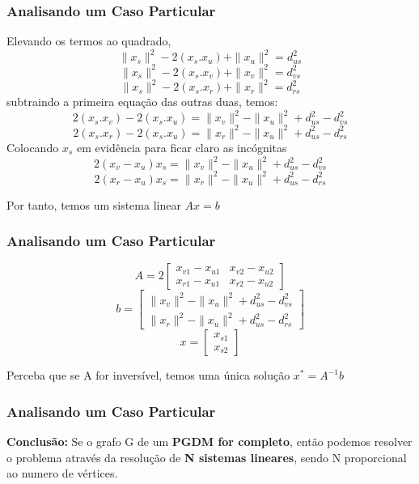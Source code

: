 \documentclass{beamer}
\begin{document}
\begin{frame}
\frametitle{\normalsize Analisando um Caso Particular}
Elevando os termos ao quadrado,
\vspace{-0.2cm}
$$\|x_{s}\|^{2} - 2(x_{s}.x_{u}) + \|x_{u}\|^{2} = d_{us}^{2}$$
\vspace{-0.7cm}$$\|x_{s}\|^{2} - 2(x_{s}.x_{v}) + \|x_{v}\|^{2} = d_{vs}^{2}$$
\vspace{-0.6cm}$$\|x_{s}\|^{2} - 2(x_{s}.x_{r}) + \|x_{r}\|^{2} = d_{rs}^{2}$$
subtraindo a primeira equação das outras duas, temos:
$$2(x_{s}.x_{v}) - 2(x_{s}.x_{u}) = \|x_{v}\|^{2} - \|x_{u}\|^{2} + d_{us}^{2} - d_{vs}^{2}$$
$$2(x_{s}.x_{r}) - 2(x_{s}.x_{u}) = \|x_{r}\|^{2} - \|x_{u}\|^{2} + d_{us}^{2} - d_{rs}^{2}$$
Colocando $x_{s}$ em evidência para ficar claro as incógnitas
$$2(x_{v} - x_{u})x_{s} = \|x_{v}\|^{2} - \|x_{u}\|^{2} + d_{us}^{2} - d_{vs}^{2}$$
$$2(x_{r} - x_{u})x_{s} = \|x_{r}\|^{2} - \|x_{u}\|^{2} + d_{us}^{2} - d_{rs}^{2}$$

Por tanto, temos um sistema linear $Ax = b$
\end{frame}

\begin{frame}
\frametitle{\normalsize Analisando um Caso Particular}
$$
A = 2\begin{bmatrix}
x_{v1} - x_{u1} & x_{v2} - x_{u2}\\
x_{r1} - x_{u1} & x_{r2} - x_{u2}
\end{bmatrix}
$$
$$
b = \begin{bmatrix}
\|x_{v}\|^{2} - \|x_{u}\|^{2} + d_{us}^{2} - d_{vs}^{2}\\
\|x_{r}\|^{2} - \|x_{u}\|^{2} + d_{us}^{2} - d_{rs}^{2}
\end{bmatrix}
$$
$$
x = \begin{bmatrix}
x_{s1}\\
x_{s2}
\end{bmatrix}
$$

Perceba que se A for inversível, temos uma única solução $x^{*} = A^{-1}b$
\end{frame}

\begin{frame}
\frametitle{\normalsize Analisando um Caso Particular}
\begin{center}
\textbf{Conclusão:} Se o grafo G de um \textbf{PGDM for completo}, então podemos resolver o problema através da resolução de\textbf{ N sistemas lineares}, sendo N proporcional ao numero de vértices.
\end{center}
\end{frame}
\end{document}
